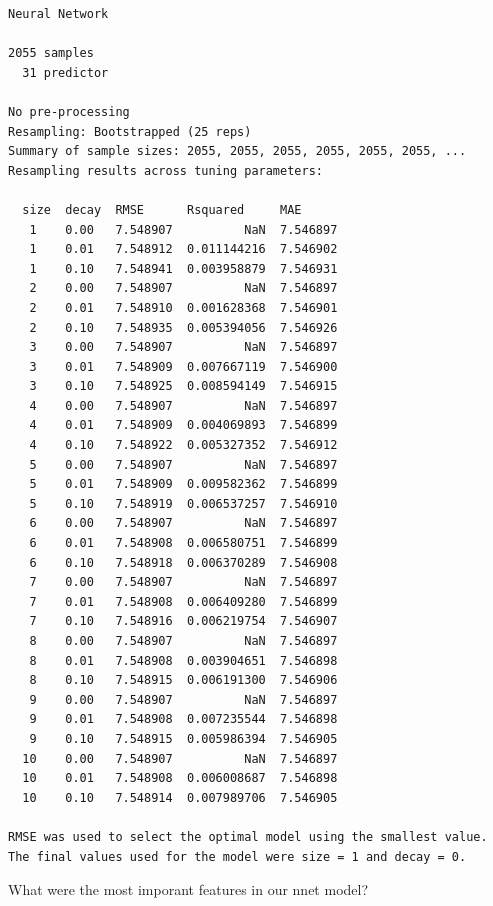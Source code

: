 \documentclass[]{report}
\newenvironment{Shaded}{\begin{snugshade}}{\end{snugshade}}
\newcommand{\CommentTok}[1]{\textcolor[rgb]{0.56,0.35,0.01}{\textit{#1}}}
\newcommand{\DataTypeTok}[1]{\textcolor[rgb]{0.13,0.29,0.53}{#1}}
\newcommand{\KeywordTok}[1]{\textcolor[rgb]{0.13,0.29,0.53}{\textbf{#1}}}
\newcommand{\NormalTok}[1]{#1}
\newcommand{\OperatorTok}[1]{\textcolor[rgb]{0.81,0.36,0.00}{\textbf{#1}}}
\newcommand{\OtherTok}[1]{\textcolor[rgb]{0.56,0.35,0.01}{#1}}
\newcommand{\StringTok}[1]{\textcolor[rgb]{0.31,0.60,0.02}{#1}}
\begin{document}
\begin{verbatim}
Neural Network 

2055 samples
  31 predictor

No pre-processing
Resampling: Bootstrapped (25 reps) 
Summary of sample sizes: 2055, 2055, 2055, 2055, 2055, 2055, ... 
Resampling results across tuning parameters:

  size  decay  RMSE      Rsquared     MAE     
   1    0.00   7.548907          NaN  7.546897
   1    0.01   7.548912  0.011144216  7.546902
   1    0.10   7.548941  0.003958879  7.546931
   2    0.00   7.548907          NaN  7.546897
   2    0.01   7.548910  0.001628368  7.546901
   2    0.10   7.548935  0.005394056  7.546926
   3    0.00   7.548907          NaN  7.546897
   3    0.01   7.548909  0.007667119  7.546900
   3    0.10   7.548925  0.008594149  7.546915
   4    0.00   7.548907          NaN  7.546897
   4    0.01   7.548909  0.004069893  7.546899
   4    0.10   7.548922  0.005327352  7.546912
   5    0.00   7.548907          NaN  7.546897
   5    0.01   7.548909  0.009582362  7.546899
   5    0.10   7.548919  0.006537257  7.546910
   6    0.00   7.548907          NaN  7.546897
   6    0.01   7.548908  0.006580751  7.546899
   6    0.10   7.548918  0.006370289  7.546908
   7    0.00   7.548907          NaN  7.546897
   7    0.01   7.548908  0.006409280  7.546899
   7    0.10   7.548916  0.006219754  7.546907
   8    0.00   7.548907          NaN  7.546897
   8    0.01   7.548908  0.003904651  7.546898
   8    0.10   7.548915  0.006191300  7.546906
   9    0.00   7.548907          NaN  7.546897
   9    0.01   7.548908  0.007235544  7.546898
   9    0.10   7.548915  0.005986394  7.546905
  10    0.00   7.548907          NaN  7.546897
  10    0.01   7.548908  0.006008687  7.546898
  10    0.10   7.548914  0.007989706  7.546905

RMSE was used to select the optimal model using the smallest value.
The final values used for the model were size = 1 and decay = 0.
\end{verbatim}

What were the most imporant features in our nnet model?

\begin{Shaded}
\end{Shaded}
\end{document}
